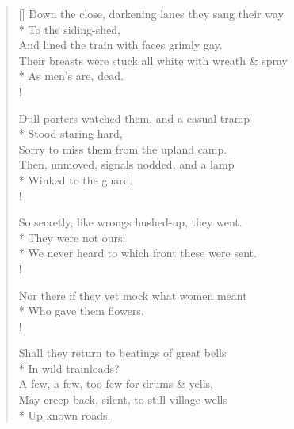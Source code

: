 \documentclass[MAIN]{subfiles}
\begin{document}
\settowidth{\versewidth}{Their breasts were stuck all white with wreath \& spray}
\begin{verse}[\versewidth]
Down the close, darkening lanes they sang their way\\*
To the siding-shed,\\
And lined the train with faces grimly gay.\\
Their breasts were stuck all white with wreath \& spray\\*
As men's are, dead.\\!

Dull porters watched them, and a casual tramp\\*
Stood staring hard,\\
Sorry to miss them from the upland camp.\\
Then, unmoved, signals nodded, and a lamp\\*
Winked to the guard.\\!

So secretly, like wrongs hushed-up, they went.\\*
They were not ours:\\*
We never heard to which front these were sent.\\!

Nor there if they yet mock what women meant\\*
Who gave them flowers.\\!

Shall they return to beatings of great bells\\*
In wild trainloads?\\
A few, a few, too few for drums \& yells,\\
May creep back, silent, to still village wells\\*
Up  known roads.
\end{verse}
\end{document}
